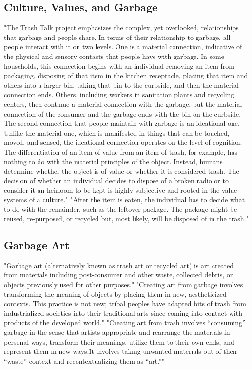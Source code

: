 \documentclass[12pt]{article}
\begin{document}
\subsection{Culture, Values, and Garbage}
"The Trash Talk project emphasizes the complex, yet overlooked, relationships that garbage and people share. In terms of their relationship to garbage, all people interact with it on two levels. One is a material connection, indicative of the physical and sensory contacts that people have with garbage. In some households, this connection begins with an individual removing an item from packaging, disposing of that item in the kitchen receptacle, placing that item and others into a larger bin, taking that bin to the curbside, and then the material connection ends. Others, including workers in sanitation plants and recycling centers, then continue a material connection with the garbage, but the material connection of the consumer and the garbage ends with the bin on the curbside. The second connection that people maintain with garbage is an ideational one. Unlike the material one, which is manifested in things that can be touched, moved, and sensed, the ideational connection operates on the level of cognition. The differentiation of an item of value from an item of trash, for example, has nothing to do with the material principles of the object. Instead, humans determine whether the object is of value or whether it is considered trash. The decision of whether an individual decides to dispose of a broken radio or to consider it an heirloom to be kept is highly subjective and rooted in the value systems of a culture." "After the item is eaten, the individual has to decide what to do with the remainder, such as the leftover package. The package might be reused, re-purposed, or recycled but, most likely, will be disposed of in the trash." \cite{lukas2012culture}

\subsection{Garbage Art}
"Garbage art (alternatively known as trash art or recycled art) is art created from materials including post-consumer and other waste, collected debris, or objects previously used for other purposes." "Creating art from garbage involves transforming the meaning of objects by placing them in new, aestheticized contexts. This practice is not new; tribal peoples have adapted bits of trash from industrialized societies into their traditional arts since coming into contact with products of the developed world." "Creating art from trash involves “consuming” garbage in the sense that artists appropriate and rearrange the materials in personal ways, transform their meanings, utilize them to their own ends, and represent them in new ways.It involves taking unwanted materials out of their “waste” context and recontextualizing them as “art.”" \cite{tauxe2012encyclopedia}
\end{document}
